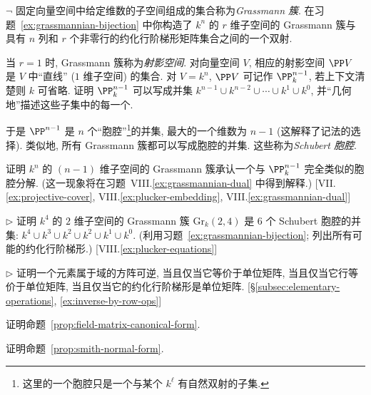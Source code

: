 \begin{prob}
\label{ex:grassmannian-cells}
$\neg$ 固定向量空间中给定维数的子空间组成的集合称为\emph{Grassmann 簇}. 在习题~\ref{ex:grassmannian-bijection} 中你构造了 $k^n$ 的 $r$ 维子空间的 Grassmann 簇与具有 $n$ 列和 $r$ 个非零行的约化行阶梯形矩阵集合之间的一个双射.

当 $r=1$ 时, Grassmann 簇称为\emph{射影空间}. 对向量空间 $V$, 相应的射影空间 $\PP V$ 是 $V$ 中``直线'' ($1$ 维子空间) 的集合. 对 $V=k^n$, $\PP V$ 可记作 $\PP_k^{n-1}$, 若上下文清楚则 $k$ 可省略. 证明 $\PP_k^{n-1}$ 可以写成并集 $k^{n-1}\cup k^{n-2}\cup\cdots\cup k^1\cup k^0$, 并``几何地''描述这些子集中的每一个.

于是 $\PP^{n-1}$ 是 $n$ 个``胞腔''\footnote{这里的一个胞腔只是一个与某个 $k^\ell$ 有自然双射的子集.}的并集, 最大的一个维数为 $n-1$ (这解释了记法的选择). 类似地, 所有 Grassmann 簇都可以写成胞腔的并集. 这些称为\emph{Schubert 胞腔}.

证明 $k^n$ 的 $(n-1)$ 维子空间的 Grassmann 簇承认一个与 $\PP_k^{n-1}$ 完全类似的胞腔分解. (这一现象将在习题~VIII.\ref{ex:grassmannian-dual} 中得到解释.) [VII.\ref{ex:projective-cover}, VIII.\ref{ex:plucker-embedding}, VIII.\ref{ex:grassmannian-dual}]
\end{prob}

\begin{prob}
\label{ex:grassmannian-24}
$\triangleright$ 证明 $k^4$ 的 $2$ 维子空间的 Grassmann 簇 $\mathrm{Gr}_k(2,4)$ 是 $6$ 个 Schubert 胞腔的并集: $k^4\cup k^3\cup k^2\cup k^2\cup k^1\cup k^0$. (利用习题~\ref{ex:grassmannian-bijection}; 列出所有可能的约化行阶梯形.) [VIII.\ref{ex:plucker-equations}]
\end{prob}

\begin{prob}
\label{ex:invertible-equiv-identity}
$\triangleright$ 证明一个元素属于域的方阵可逆, 当且仅当它等价于单位矩阵, 当且仅当它行等价于单位矩阵, 当且仅当它的约化行阶梯形是单位矩阵. [§\ref{subsec:elementary-operations}, \ref{ex:inverse-by-row-ops}]
\end{prob}

\begin{prob}
\label{ex:prove-prop-2-10}
证明命题~\ref{prop:field-matrix-canonical-form}.
\end{prob}

\begin{prob}
\label{ex:prove-prop-2-11}
证明命题~\ref{prop:smith-normal-form}.
\end{prob}

